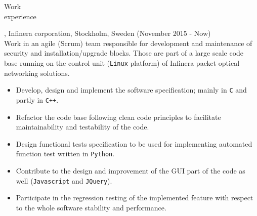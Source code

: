 \documentclass{resume}
\begin{document}
\begin{category}{Work \\experience}

, Infinera corporation, Stockholm, Sweden (November 2015 - Now)\\
Work in an agile (Scrum) team responsible for development and maintenance of security
and installation/upgrade blocks. Those are part of a large scale code base running on 
the control unit (\texttt{Linux} platform) of Infinera packet optical networking solutions.
\begin{itemize}
 \item Develop, design and implement the software specification; mainly in \texttt{C} and partly in \texttt{C++}.
 \item Refactor the code base following clean code principles to facilitate maintainability and testability of the code.
 \item Design functional tests specification to be used for implementing automated function test written in \texttt{Python}.
 \item Contribute to the design and improvement of the GUI part of the code as well (\texttt{Javascript} and \texttt{JQuery}).
 \item Participate in the regression testing of the implemented feature with respect to the whole software stability and performance. 
\end{itemize}


\end{category}
\end{document}
